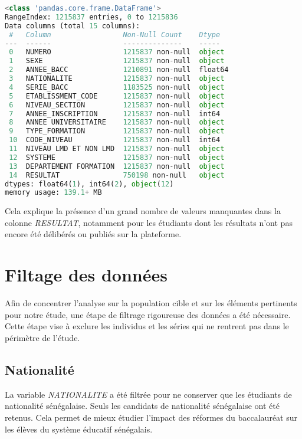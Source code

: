 \begin{lstlisting}[language=Python,
    caption=Info global du data des inscriptions et résultats, 
    label=lst:inscription_resultat_ucad, 
    basicstyle=\ttfamily\footnotesize, 
    backgroundcolor=\color{gray!10}
]
<class 'pandas.core.frame.DataFrame'>
RangeIndex: 1215837 entries, 0 to 1215836
Data columns (total 15 columns):
 #   Column                 Non-Null Count    Dtype  
---  ------                 --------------    -----  
 0   NUMERO                 1215837 non-null  object 
 1   SEXE                   1215837 non-null  object 
 2   ANNEE_BACC             1210891 non-null  float64
 3   NATIONALITE            1215837 non-null  object 
 4   SERIE_BACC             1183525 non-null  object 
 5   ETABLISSMENT_CODE      1215837 non-null  object 
 6   NIVEAU_SECTION         1215837 non-null  object 
 7   ANNEE_INSCRIPTION      1215837 non-null  int64  
 8   ANNEE UNIVERSITAIRE    1215837 non-null  object 
 9   TYPE_FORMATION         1215837 non-null  object 
 10  CODE_NIVEAU            1215837 non-null  int64  
 11  NIVEAU LMD ET NON LMD  1215837 non-null  object 
 12  SYSTEME                1215837 non-null  object 
 13  DEPARTEMENT FORMATION  1215837 non-null  object 
 14  RESULTAT               750198 non-null   object 
dtypes: float64(1), int64(2), object(12)
memory usage: 139.1+ MB
\end{lstlisting}

Cela explique la présence d’un grand nombre de valeurs manquantes dans la colonne \textit{RESULTAT}, 
notamment pour les étudiants dont les résultats n'ont pas encore été délibérés ou publiés sur la plateforme.

\newpage
\section{Filtage des données}

Afin de concentrer l’analyse sur la population cible et sur les éléments pertinents pour notre étude, 
une étape de filtrage rigoureuse des données a été nécessaire. 
Cette étape vise à exclure les individus et les séries qui ne rentrent pas dans le périmètre de l’étude.

\subsection{Nationalité}

La variable \textit{NATIONALITE} a été filtrée pour ne conserver que les étudiants de nationalité sénégalaise.
Seuls les candidats de nationalité sénégalaise ont été retenus. 
Cela permet de mieux étudier l’impact des réformes du baccalauréat sur les élèves du système éducatif sénégalais.

